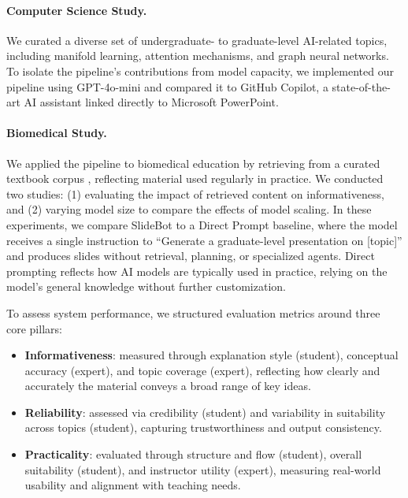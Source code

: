 \documentclass[letterpaper]{article} %
\begin{document}
\paragraph{Computer Science Study.}
We curated a diverse set of undergraduate- to graduate-level AI-related topics, including manifold learning, attention mechanisms, and graph neural networks. To isolate the pipeline’s contributions from model capacity, we implemented our pipeline using GPT-4o-mini and compared it to GitHub Copilot, a state-of-the-art AI assistant linked directly to Microsoft PowerPoint.

\paragraph{Biomedical Study.}
We applied the pipeline to biomedical education by retrieving from a curated textbook corpus \citep{jin2021disease}, reflecting material used regularly in practice. We conducted two studies: (1) evaluating the impact of retrieved content on informativeness, and (2) varying model size to compare the effects of model scaling. In these experiments, we compare SlideBot to a Direct Prompt baseline, where the model receives a single instruction to “Generate a graduate-level presentation on [topic]” and produces slides without retrieval, planning, or specialized agents. Direct prompting reflects how AI models are typically used in practice, relying on the model’s general knowledge without further customization.



 

To assess system performance, we structured evaluation metrics around three core pillars:

\begin{itemize}
\item \textbf{Informativeness}: measured through explanation style (student), conceptual accuracy (expert), and topic coverage (expert), reflecting how clearly and accurately the material conveys a broad range of key ideas.
\item \textbf{Reliability}: assessed via credibility (student) and variability in suitability across topics (student), capturing trustworthiness and output consistency.
\item \textbf{Practicality}: evaluated through structure and flow (student), overall suitability (student), and instructor utility (expert), measuring real-world usability and alignment with teaching needs.
\end{itemize}
\end{document}
